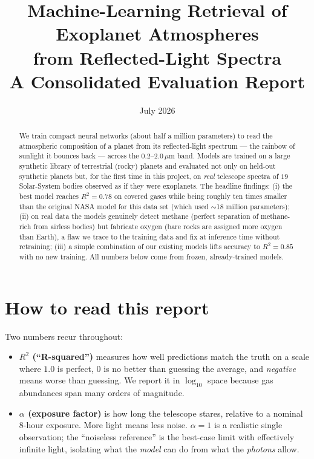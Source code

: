 \documentclass[11pt]{article}
\title{\textbf{Machine-Learning Retrieval of Exoplanet Atmospheres\\
from Reflected-Light Spectra}\\[4pt]
\large A Consolidated Evaluation Report}
\author{}
\date{July 2026}
\newcommand{\rsq}{$R^2$}
\newcommand{\um}{\,$\mu$m}
\newcommand{\alp}{$\alpha$}
\begin{document}
\maketitle

\begin{abstract}
\noindent
We train compact neural networks (about half a million parameters) to read the
atmospheric composition of a planet from its reflected-light spectrum --- the rainbow of
sunlight it bounces back --- across the $0.2$--$2.0$\um{} band. Models are trained on a
large synthetic library of terrestrial (rocky) planets and evaluated not only on held-out
synthetic planets but, for the first time in this project, on \emph{real} telescope spectra
of $19$ Solar-System bodies observed as if they were exoplanets. The headline findings:
(i) the best model reaches $R^2 = 0.78$ on covered gases while being roughly ten times
smaller than the original NASA model for this data set (which used $\sim$18 million
parameters); (ii) on real data the models genuinely detect methane (perfect separation of
methane-rich from airless bodies) but fabricate oxygen (bare rocks are assigned more oxygen
than Earth), a flaw we trace to the training data and fix at inference time without
retraining; (iii) a simple combination of our existing models lifts accuracy to
$R^2 = 0.85$ with no new training. All numbers below come from frozen, already-trained
models.
\end{abstract}

\tableofcontents
\vspace{1em}

\section*{How to read this report}

Two numbers recur throughout:

\begin{itemize}[nosep]
\item \textbf{\rsq{} (``R-squared'')} measures how well predictions match the truth on a
scale where $1.0$ is perfect, $0$ is no better than guessing the average, and
\emph{negative} means worse than guessing. We report it in $\log_{10}$ space because gas
abundances span many orders of magnitude.
\item \textbf{\alp{} (exposure factor)} is how long the telescope stares, relative to a
nominal $8$-hour exposure. More light means less noise. $\alpha = 1$ is a realistic single
observation; the ``noiseless reference'' is the best-case limit with effectively infinite
light, isolating what the \emph{model} can do from what the \emph{photons} allow.
\end{itemize}
\end{document}
